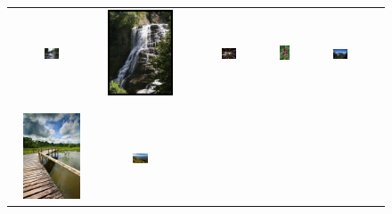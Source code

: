\documentclass[10pt,journal,compsoc]{IEEEtran}
\begin{document}
\begin{figure}[th]
{\small{
\begin{center}
\begin{tabular}{@{}c@{\,\,\,}c@{\,\,\,}c@{\,\,\,}c@{\,\,\,}c@{\,\,\,}}
\includegraphics[width=0.19\textwidth]{imggrid/datasetposi/1.jpg} &
\includegraphics[height=1in]{imggrid/datasetposi/2.jpg} &
\includegraphics[width=0.19\textwidth]{imggrid/datasetposi/3.jpg} &
\includegraphics[height=1in]{imggrid/datasetposi/4.jpg} &
\includegraphics[width=0.19\textwidth]{imggrid/datasetposi/5.jpg} \\
\\[-6pt]
\hline
\\[-6pt]
\includegraphics[height=1in]{imggrid/datasetposi/6.jpg} &
\includegraphics[width=0.19\textwidth]{imggrid/datasetposi/7.jpg} &

\end{tabular}
\end{center}}}
\end{figure}
\end{document}
